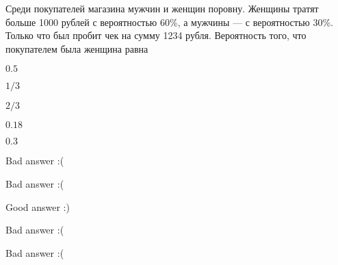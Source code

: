 
\begin{question}
Среди покупателей магазина мужчин и женщин поровну. Женщины тратят
больше 1000 рублей с вероятностью 60\%, а мужчины — с вероятностью
30\%. Только что был пробит чек на сумму 1234 рубля. Вероятность того,
что покупателем была женщина равна
\begin{answerlist}
  \item \(0.5\)
  \item \(1/3\)
  \item \(2/3\)
  \item \(0.18\)
  \item \(0.3\)
\end{answerlist}
\end{question}

\begin{solution}
\begin{answerlist}
  \item Bad answer :(
  \item Bad answer :(
  \item Good answer :)
  \item Bad answer :(
  \item Bad answer :(
\end{answerlist}
\end{solution}

